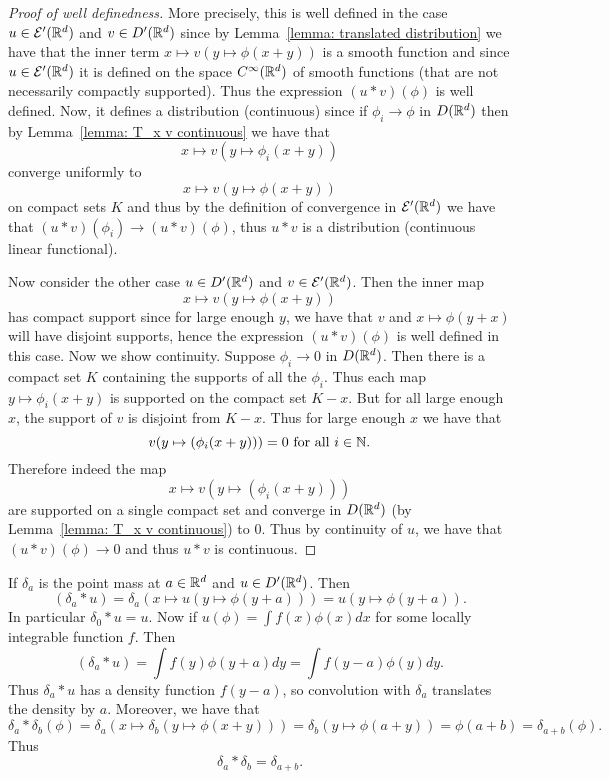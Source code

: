 \documentclass[twoside, a4paper, 10pt]{amsart}
\begin{document}
\begin{proof}[Proof of well definedness] More precisely, this is well defined in the case $u \in \mathcal{E}'(\mathbb{R}^d)$ and $v \in D'(\mathbb{R}^d)$ since by Lemma~\ref{lemma: translated distribution} we have that the inner term $x \mapsto v(y \mapsto \phi(x+y))$ is a smooth function and since $u \in \mathcal{E}'(\mathbb{R}^d)$ it is defined on the space $C^{\infty}(\mathbb{R}^d)$ of smooth functions (that are not necessarily compactly supported). Thus the expression $(u * v)(\phi)$ is well defined. Now, it defines a distribution (continuous) since if $\phi_i \to \phi$ in $D(\mathbb{R}^d)$ then by Lemma~\ref{lemma: T_x v continuous} we have that $$x \mapsto v(y \mapsto \phi_i(x+y))$$ converge uniformly to $$x \mapsto v(y \mapsto \phi(x+y))$$ on compact sets $K$ and thus by the definition of convergence in $\mathcal{E}'(\mathbb{R}^d)$ we have that $(u * v)(\phi_i) \to (u*v)(\phi)$, thus $u * v$ is a distribution (continuous linear functional).

Now consider the other case $u \in D'(\mathbb{R}^d)$ and $v \in \mathcal{E}'(\mathbb{R}^d)$. Then the inner map $$x \mapsto v(y \mapsto \phi(x+y))$$ has compact support since for large enough $y$, we have that $v$ and $x \mapsto \phi(y+x)$ will have disjoint supports, hence the expression $(u * v)(\phi)$ is well defined in this case. Now we show continuity. Suppose $\phi_i \to 0$ in $D(\mathbb{R}^d)$. Then there is a compact set $K$ containing the supports of all the $\phi_i$. Thus each map $y \mapsto \phi_i(x+y)$ is supported on the compact set $K-x$. But for all large enough $x$, the support of $v$ is disjoint from $K-x$. Thus for large enough $x$ we have that $$v(y \mapsto (\phi_i (x+y))) = 0 \text{ for all } i \in \mathbb{N}.$$ Therefore indeed the map $$x \mapsto v(y \mapsto (\phi_i (x+y)))$$ are supported on a single compact set and converge in $D(\mathbb{R}^d)$ (by Lemma~\ref{lemma: T_x v continuous}) to $0$. Thus by continuity of $u$, we have that $(u*v)(\phi) \to 0$ and thus $u*v$ is continuous. \end{proof}

\begin{eg} If $\delta_a$ is the point mass at $a \in \mathbb{R}^d$ and $u \in D'(\mathbb{R}^d)$. Then $$(\delta_a * u) = \delta_a(x \mapsto u(y \mapsto \phi(y+a))) = u(y \mapsto \phi(y+a)).$$ In particular $\delta_0 * u = u$. Now if $u(\phi) = \int f(x) \phi(x) dx$ for some locally integrable function $f$. Then $$(\delta_a * u) = \int f(y)\phi(y+a) dy = \int f(y-a)\phi(y) dy.$$ Thus $\delta_a * u$ has a density function $f(y-a)$, so convolution with $\delta_a$ translates the density by $a$. Moreover, we have that $$\delta_a * \delta_b (\phi) = \delta_a(x \mapsto \delta_b(y \mapsto \phi(x+y))) = \delta_b (y \mapsto \phi(a+y)) = \phi(a+b) = \delta_{a+b}(\phi).$$ Thus $$\delta_a * \delta_b = \delta_{a+b}.$$

\end{eg}
\end{document}
